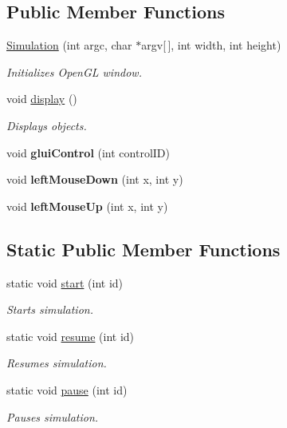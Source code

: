 \subsection*{Public Member Functions}
\begin{DoxyCompactItemize}
\item 
\hyperlink{classSimulation_a4c669ceaa34c7130966ce45f9de75fbe}{Simulation} (int argc, char $\ast$argv\mbox{[}$\,$\mbox{]}, int width, int height)
\begin{DoxyCompactList}\small\item\em Initializes Open\-G\-L window. \end{DoxyCompactList}\item 
void \hyperlink{classSimulation_a449dcb7d97dfba99efe770de2f399c31}{display} ()
\begin{DoxyCompactList}\small\item\em Displays objects. \end{DoxyCompactList}\item 
\hypertarget{classSimulation_a1607cd18e552ab9f4a6f57d362f7121a}{void {\bfseries glui\-Control} (int control\-I\-D)}\label{classSimulation_a1607cd18e552ab9f4a6f57d362f7121a}

\item 
\hypertarget{classSimulation_a786d1ba31d29937f0ac6f3ea88f8a607}{void {\bfseries left\-Mouse\-Down} (int x, int y)}\label{classSimulation_a786d1ba31d29937f0ac6f3ea88f8a607}

\item 
\hypertarget{classSimulation_a62ef254d85017074cd521a5787b5a234}{void {\bfseries left\-Mouse\-Up} (int x, int y)}\label{classSimulation_a62ef254d85017074cd521a5787b5a234}

\end{DoxyCompactItemize}
\subsection*{Static Public Member Functions}
\begin{DoxyCompactItemize}
\item 
static void \hyperlink{classSimulation_acfbe29877511e1db19de6228c0f0caa2}{start} (int id)
\begin{DoxyCompactList}\small\item\em Starts simulation. \end{DoxyCompactList}\item 
static void \hyperlink{classSimulation_a8d1e79b53836e7f99d1946b9148c2400}{resume} (int id)
\begin{DoxyCompactList}\small\item\em Resumes simulation. \end{DoxyCompactList}\item 
static void \hyperlink{classSimulation_a8c8072e3d10589704d12aa3f3d8ef1e0}{pause} (int id)
\begin{DoxyCompactList}\small\item\em Pauses simulation. \end{DoxyCompactList}\end{DoxyCompactItemize}
